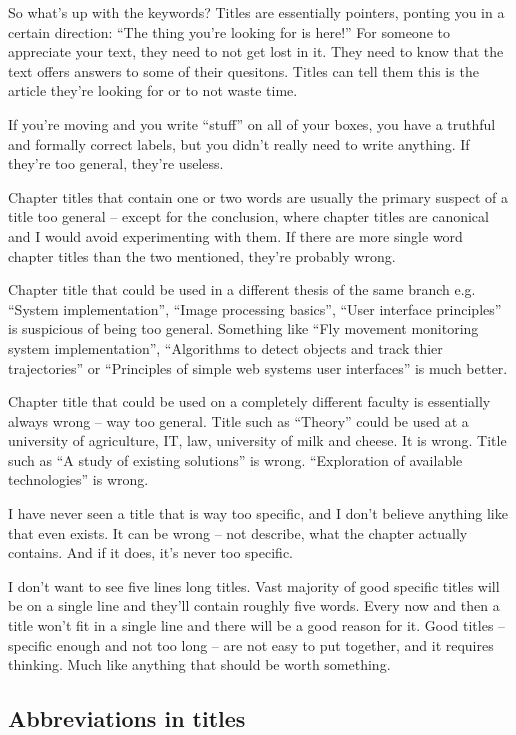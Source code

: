 So what's up with the keywords? Titles are essentially pointers, ponting you in a certain direction: ``The thing you're looking for is here!'' For someone to appreciate your text, they need to not get lost in it. They need to know that the text offers answers to some of their quesitons. Titles can tell them this is the article they're looking for or to not waste time.

If you're moving and you write ``stuff'' on all of your boxes, you have a truthful and formally correct labels, but you didn't really need to write anything. If they're too general, they're useless.

Chapter titles that contain one or two words are usually the primary suspect of a title too general -- except for the conclusion, where chapter titles are canonical and I would avoid experimenting with them. If there are more single word chapter titles than the two mentioned, they're probably wrong.

Chapter title that could be used in a different thesis of the same branch e.g. ``System implementation'', ``Image processing basics'', ``User interface principles'' is suspicious of being too general. Something like ``Fly movement monitoring system implementation'', ``Algorithms to detect objects and track thier trajectories'' or ``Principles of simple web systems user interfaces'' is much better.

Chapter title that could be used on a completely different faculty is essentially always wrong -- way too general. Title such as ``Theory'' could be used at a university of agriculture, IT, law, university of milk and cheese. It is wrong. Title such as ``A study of existing solutions'' is wrong. ``Exploration of available technologies'' is wrong.

I have never seen a title that is way too specific, and I don't believe anything like that even exists. It can be wrong -- not describe, what the chapter actually contains. And if it does, it's never too specific.

I don't want to see five lines long titles. Vast majority of good specific titles will be on a single line and they'll contain roughly five words. Every now and then a title won't fit in a single line and there will be a good reason for it. Good titles -- specific enough and not too long -- are not easy to put together, and it requires thinking. Much like anything that should be worth something.


\subsection*{Abbreviations in titles}


